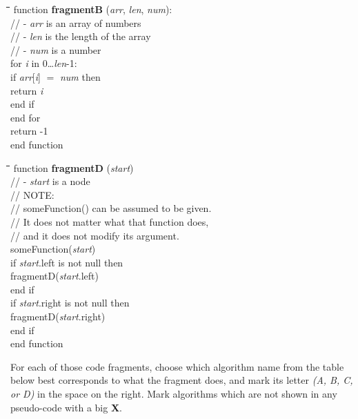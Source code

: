 \documentclass[a4paper]{article}
\begin{document}
\hfill%
\begin{minipage}[t]{0.44\columnwidth}
  
  \begin{tabbing}
    \quad\=\quad\=\quad\=\quad\=\quad\=\kill
    function \textbf{fragmentB} (\emph{arr}, \emph{len}, \emph{num}):\\
    \>// - \emph{arr} is an array of numbers\\
    \>// - \emph{len} is the length of the array\\
    \>// - \emph{num} is a number\\
    \>for \emph{i} in 0\ldots\emph{len}-1:\\
    \>\>if \emph{arr}[\emph{i}] $=$ \emph{num} then\\
    \>\>\>return \emph{i}\\
    \>\>end if\\
    \>end for\\
    \>return -1\\
    end function
  \end{tabbing}
  
  \begin{tabbing}
    \quad\=\quad\=\quad\=\quad\=\quad\=\kill
    function \textbf{fragmentD} (\emph{start})\\
    \>// - \emph{start} is a node\\
    \>// NOTE:\\
    \>// \quad someFunction() can be assumed to be given.\\
    \>// \quad It does not matter what that function does,\\
    \>// \quad and it does not modify its argument.\\
    \>someFunction(\emph{start})\\
    \>if \emph{start}.left is not null then\\
    \>\>fragmentD(\emph{start}.left)\\
    \>end if\\
    \>if \emph{start}.right is not null then\\
    \>\>fragmentD(\emph{start}.right)\\
    \>end if\\
    end function
  \end{tabbing}
\end{minipage}
\normalsize
\vspace{\baselineskip}

For each of those code fragments, choose which algorithm name from the table below best corresponds to what the fragment does, and mark its letter \emph{(A, B, C, or D)} in the space on the right.
Mark algorithms which are not shown in any pseudo-code with a big \textbf{X}.
\end{document}
